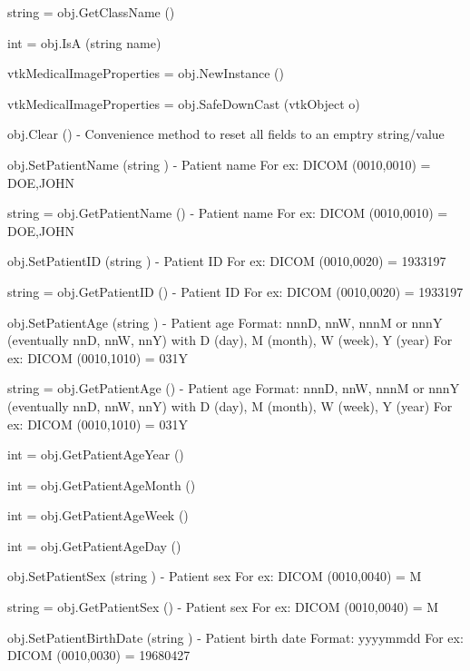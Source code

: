 \begin{DoxyItemize}
\item {\ttfamily string = obj.\-Get\-Class\-Name ()}  
\item {\ttfamily int = obj.\-Is\-A (string name)}  
\item {\ttfamily vtk\-Medical\-Image\-Properties = obj.\-New\-Instance ()}  
\item {\ttfamily vtk\-Medical\-Image\-Properties = obj.\-Safe\-Down\-Cast (vtk\-Object o)}  
\item {\ttfamily obj.\-Clear ()} -\/ Convenience method to reset all fields to an emptry string/value  
\item {\ttfamily obj.\-Set\-Patient\-Name (string )} -\/ Patient name For ex\-: D\-I\-C\-O\-M (0010,0010) = D\-O\-E,J\-O\-H\-N  
\item {\ttfamily string = obj.\-Get\-Patient\-Name ()} -\/ Patient name For ex\-: D\-I\-C\-O\-M (0010,0010) = D\-O\-E,J\-O\-H\-N  
\item {\ttfamily obj.\-Set\-Patient\-I\-D (string )} -\/ Patient I\-D For ex\-: D\-I\-C\-O\-M (0010,0020) = 1933197  
\item {\ttfamily string = obj.\-Get\-Patient\-I\-D ()} -\/ Patient I\-D For ex\-: D\-I\-C\-O\-M (0010,0020) = 1933197  
\item {\ttfamily obj.\-Set\-Patient\-Age (string )} -\/ Patient age Format\-: nnn\-D, nn\-W, nnn\-M or nnn\-Y (eventually nn\-D, nn\-W, nn\-Y) with D (day), M (month), W (week), Y (year) For ex\-: D\-I\-C\-O\-M (0010,1010) = 031\-Y  
\item {\ttfamily string = obj.\-Get\-Patient\-Age ()} -\/ Patient age Format\-: nnn\-D, nn\-W, nnn\-M or nnn\-Y (eventually nn\-D, nn\-W, nn\-Y) with D (day), M (month), W (week), Y (year) For ex\-: D\-I\-C\-O\-M (0010,1010) = 031\-Y  
\item {\ttfamily int = obj.\-Get\-Patient\-Age\-Year ()}  
\item {\ttfamily int = obj.\-Get\-Patient\-Age\-Month ()}  
\item {\ttfamily int = obj.\-Get\-Patient\-Age\-Week ()}  
\item {\ttfamily int = obj.\-Get\-Patient\-Age\-Day ()}  
\item {\ttfamily obj.\-Set\-Patient\-Sex (string )} -\/ Patient sex For ex\-: D\-I\-C\-O\-M (0010,0040) = M  
\item {\ttfamily string = obj.\-Get\-Patient\-Sex ()} -\/ Patient sex For ex\-: D\-I\-C\-O\-M (0010,0040) = M  
\item {\ttfamily obj.\-Set\-Patient\-Birth\-Date (string )} -\/ Patient birth date Format\-: yyyymmdd For ex\-: D\-I\-C\-O\-M (0010,0030) = 19680427  

\end{DoxyItemize}
